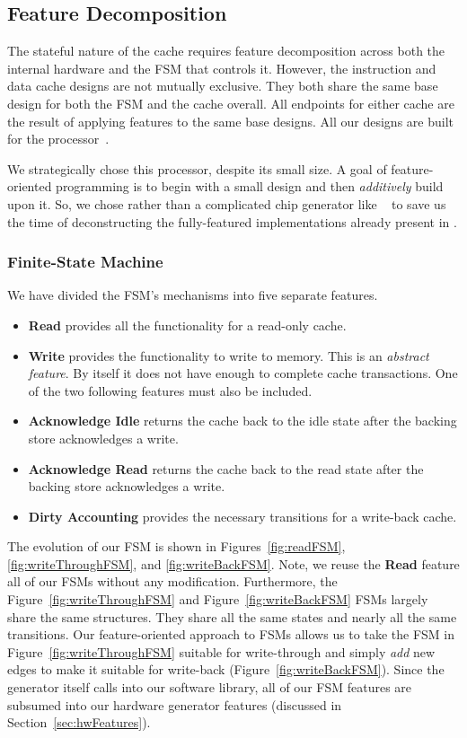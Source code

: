 \documentclass[conference]{IEEEtran}
\begin{document}
\subsection{Feature Decomposition}
The stateful nature of the cache requires feature decomposition across both the internal hardware and the FSM that controls it. However, the instruction and data cache designs are not mutually exclusive. They both share the same base design for both the FSM and the cache overall. All endpoints for either cache are the result of applying features to the same base designs. All our designs are built for the \Riscvmini{} processor~\cite{RvMini}.

We strategically chose this processor, despite its small size. A goal of feature-oriented programming is to begin with a small design and then \emph{additively} build upon it. So, we chose \Riscvmini{} rather than a complicated chip generator like \Rocketchip{}~\cite{chisel:riscv} to save us the time of deconstructing the fully-featured implementations already present in \Rocketchip{}.

\subsubsection{Finite-State Machine}
We have divided the FSM's mechanisms into five separate features.
\begin{itemize}
    \item \textbf{Read} provides all the functionality for a read-only cache. 
    \item \textbf{Write} provides the functionality to write to memory. This is an \emph{abstract feature}. By itself it does not have enough to complete cache transactions. One of the two following features must also be included.
    \item \textbf{Acknowledge Idle} returns the cache back to the idle state after the backing store acknowledges a write.
    \item \textbf{Acknowledge Read} returns the cache back to the read state after the backing store acknowledges a write.
    \item \textbf{Dirty Accounting} provides the necessary transitions for a write-back cache.
\end{itemize}

The evolution of our FSM is shown in Figures~\ref{fig:readFSM}, \ref{fig:writeThroughFSM}, and \ref{fig:writeBackFSM}. Note, we reuse the \textbf{Read} feature all of our FSMs without any modification. Furthermore, the Figure~\ref{fig:writeThroughFSM} and Figure~\ref{fig:writeBackFSM} FSMs largely share the same structures. They share all the same states and nearly all the same transitions. Our feature-oriented approach to FSMs allows us to take the FSM in Figure~\ref{fig:writeThroughFSM} suitable for write-through and simply \emph{add} new edges to make it suitable for write-back (Figure~\ref{fig:writeBackFSM}). Since the generator itself calls into our software library, all of our FSM features are subsumed into our hardware generator features (discussed in Section~\ref{sec:hwFeatures}). 
\end{document}
